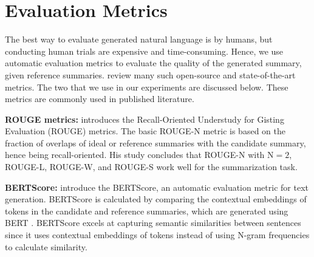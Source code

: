 \section{Evaluation Metrics}
	\label{sec:metrics}

	The best way to evaluate generated natural language is by humans, but conducting
	human trials are expensive and time-consuming.
	Hence, we use automatic evaluation metrics to evaluate the quality of the generated
	summary, given reference summaries.
	\citet{fabbri2021summeval} review many such open-source and state-of-the-art metrics.
	The two that we use in our experiments are discussed below.
	These metrics are commonly used in published literature.

	\textbf{ROUGE metrics:} \citet{lin-2004-rouge} introduces the Recall-Oriented Understudy
	for Gisting Evaluation (ROUGE) metrics.
	The basic ROUGE-N metric is based on the fraction of overlaps of ideal or reference summaries
	with the candidate summary, hence being recall-oriented.
	His study concludes that ROUGE-N with $\text{N} = 2$, ROUGE-L, ROUGE-W, and ROUGE-S work
	well for the summarization task.

	\textbf{BERTScore:} \citet{zhang2019bertscore} introduce the BERTScore, an automatic
	evaluation metric for text generation.
	BERTScore is calculated by comparing the contextual embeddings of tokens in the candidate
	and reference summaries, which are generated using BERT \cite{devlin2018bert}.
	BERTScore excels at capturing semantic similarities between sentences since it uses
	contextual embeddings of tokens instead of using N-gram frequencies to calculate similarity.
